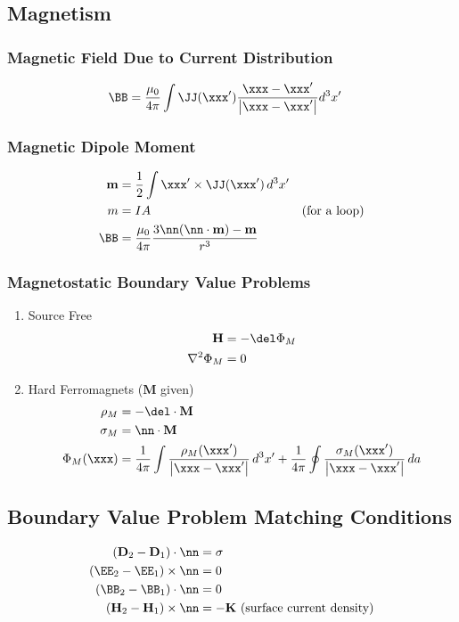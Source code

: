 \documentclass[11pt]{article}
\renewcommand{\HH}{\mathbf{H}}
\newcommand{\DD}{\mathbf{D}}
\newcommand{\MM}{\mathbf{M}}
\newcommand{\mm}{\mathbf{m}}
\begin{document}
\subsection{Magnetism}
\label{sec:orge0d627f}
\subsubsection{Magnetic Field Due to Current Distribution}
\label{sec:org3d769ac}
\begin{align*}
\BB & = \frac{\mu_0}{4\pi} \int \JJ(\xxx') \frac{\xxx - \xxx'}{\left| \xxx - \xxx' \right|} d^3 x'
\end{align*}
\subsubsection{Magnetic Dipole Moment}
\label{sec:orgc98a021}
\begin{align*}
\mm & = \frac{1}{2} \int \xxx' \times \JJ(\xxx') \, d^3 x' \\
m & = I A & \mbox{(for a loop)} \\
\BB & = \frac{\mu_0}{4\pi} \frac{3\nn (\nn \cdot \mm) - \mm}{r^3}
\end{align*}
\subsubsection{Magnetostatic Boundary Value Problems}
\label{sec:org7766e67}
\begin{enumerate}
\item Source Free
\label{sec:org093215d}
\begin{align*}
\HH & = -\del \Phi_M \\
\nabla^2 \Phi_M & = 0
\end{align*}
\item Hard Ferromagnets (\(\MM\) given)
\label{sec:org9d0c2a4}
\begin{align*}
\rho_M & = -\del \cdot \MM \\
\sigma_M & = \nn \cdot \MM \\
\Phi_M(\xxx) & = \frac{1}{4\pi} \int \frac{\rho_M(\xxx')}{\left| \xxx - \xxx' \right|} \, d^3 x'
               + \frac{1}{4\pi} \oint \frac{\sigma_M(\xxx')}{\left| \xxx - \xxx' \right|} \, da
\end{align*}
\end{enumerate}
\subsection{Boundary Value Problem Matching Conditions}
\label{sec:org8d67341}
\begin{align*}
(\DD_2 - \DD_1) \cdot \nn & = \sigma \\
(\EE_2 - \EE_1) \times \nn & = 0 \\
(\BB_2 - \BB_1) \cdot \nn & = 0 \\
(\HH_2 - \HH_1) \times \nn & = -\mathbf{K} \mbox{ (surface current density)}
\end{align*}
\end{document}
